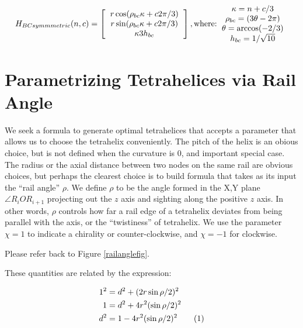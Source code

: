\documentclass[11pt]{article}
\newcommand\numberthis{\addtocounter{equation}{1}\tag{\theequation}}
\begin{document}
\begin{equation}
H_{BCsymmmetric}(n,c) =
\left [
  \begin{tabular}{c}
   $ r  \cos(\rho_{bc} \kappa  + c 2 \pi /3) $\\
   $ r  \sin(\rho_{bc} \kappa  + c 2 \pi /3) $\\
   $ \kappa 3  h_{bc} $
  \end{tabular}
  \right ],
\text{where:}
  \begin{tabular}{c}
 $\kappa = n + c/3$ \\
    $\rho_{bc} = (3 \theta - 2 \pi)$ \\
    $ \theta = \arccos(-2/3) $ \\
    $ h_{bc} = 1/\sqrt{10} $ \\    
  \end{tabular}      
\end{equation}

\section{Parametrizing Tetrahelices via Rail Angle}

We seek a formula to generate optimal tetrahelices that accepts a
parameter that allows us to choose the tetrahelix conveniently. The
pitch of the helix is an obious choice, but is not defined when the
curvature is $0$, and important special case. The radius or the axial
distance between two nodes on the same rail are obvious choices, but
perhaps the clearest choice is to build formula that takes as its
input the ``rail angle'' $\rho$. We define $\rho$ to be the angle
formed in the X,Y plane $\angle R_i O R_{i+1}$ projecting out the $z$
axis and sighting along the positive $z$ axis. In other words, $\rho$
controls how far a rail edge of a tetrahelix deviates from being
parallel with the axis, or the ``twistiness'' of tetrahelix. We use
the parameter $\chi = 1$ to indicate a chirality or counter-clockwise,
and $\chi = -1$ for clockwise.

Please refer back to Figure \ref{railanglefig}.

 These quantities are related by the expression:

\begin{align*}
  1^2 &= d^2 + (2 r \sin{ \rho / 2})^2 \\
  1 &= d^2 + 4 r^2 (\sin{ \rho / 2})^2 \\
  d^2 &= 1 - 4 r^2 (\sin{ \rho / 2})^2    \numberthis  \label{railangle} \\
\end{align*}
\end{document}
